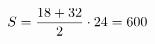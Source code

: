 \documentclass[preview]{standalone}
\begin{document}
\begin{align*}
\special{dvisvgm:raw <g id='unique000'>}S=\frac{18+32}{2}\cdot24=600\special{dvisvgm:raw </g>}
\end{align*}
\end{document}

